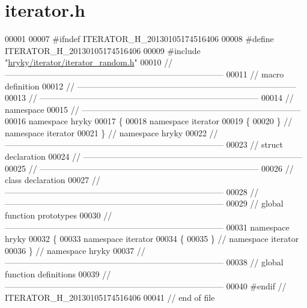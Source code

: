 \hypertarget{iterator_8h_source}{\section{iterator.\-h}
}

\begin{DoxyCode}
00001 
00007 \textcolor{preprocessor}{#ifndef ITERATOR\_H\_20130105174516406}
00008 \textcolor{preprocessor}{}\textcolor{preprocessor}{#define ITERATOR\_H\_20130105174516406}
00009 \textcolor{preprocessor}{}\textcolor{preprocessor}{#include "\hyperlink{iterator__random_8h}{hryky/iterator/iterator_random.h}"}
00010 \textcolor{comment}{//
      ------------------------------------------------------------------------------}
00011 \textcolor{comment}{// macro definition}
00012 \textcolor{comment}{//
      ------------------------------------------------------------------------------}
00013 \textcolor{comment}{//
      ------------------------------------------------------------------------------}
00014 \textcolor{comment}{// namespace}
00015 \textcolor{comment}{//
      ------------------------------------------------------------------------------}
00016 \textcolor{keyword}{namespace }hryky
00017 \{
00018 \textcolor{keyword}{namespace }iterator
00019 \{
00020 \} \textcolor{comment}{// namespace iterator}
00021 \} \textcolor{comment}{// namespace hryky}
00022 \textcolor{comment}{//
      ------------------------------------------------------------------------------}
00023 \textcolor{comment}{// struct declaration}
00024 \textcolor{comment}{//
      ------------------------------------------------------------------------------}
00025 \textcolor{comment}{//
      ------------------------------------------------------------------------------}
00026 \textcolor{comment}{// class declaration}
00027 \textcolor{comment}{//
      ------------------------------------------------------------------------------}
00028 \textcolor{comment}{//
      ------------------------------------------------------------------------------}
00029 \textcolor{comment}{// global function prototypes}
00030 \textcolor{comment}{//
      ------------------------------------------------------------------------------}
00031 \textcolor{keyword}{namespace }hryky
00032 \{
00033 \textcolor{keyword}{namespace }iterator
00034 \{
00035 \} \textcolor{comment}{// namespace iterator}
00036 \} \textcolor{comment}{// namespace hryky}
00037 \textcolor{comment}{//
      ------------------------------------------------------------------------------}
00038 \textcolor{comment}{// global function definitions}
00039 \textcolor{comment}{//
      ------------------------------------------------------------------------------}
00040 \textcolor{preprocessor}{#endif // ITERATOR\_H\_20130105174516406}
00041 \textcolor{preprocessor}{}\textcolor{comment}{// end of file}
\end{DoxyCode}
